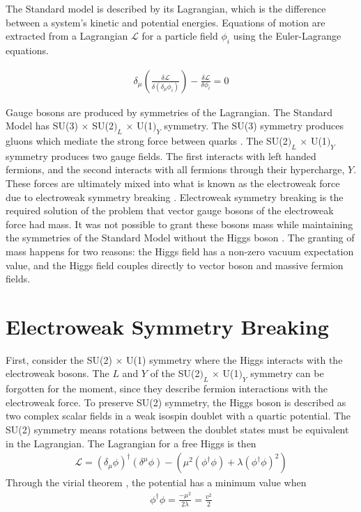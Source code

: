 The Standard model is described by its Lagrangian,
which is the difference between a system's kinetic and potential energies.
Equations of motion are extracted from a Lagrangian $\mathcal{L}$
for a particle field $\phi_i$ using the Euler-Lagrange equations.

\begin{gather}
  \delta_\mu\left(\frac{\delta \mathcal{L}}{\delta(\delta_\mu \phi_i)}\right) -
  \frac{\delta \mathcal{L}}{\delta \phi_i} = 0
\end{gather}

Gauge bosons are produced by symmetries of the Lagrangian.
The Standard Model has SU(3) $\times$ SU(2$)_L$ $\times$ U(1$)_Y$ symmetry.
The SU(3) symmetry produces gluons which mediate the strong force between quarks \cite{PhysRevLett.30.1343}.
The SU(2$)_L$ $\times$ U(1$)_Y$ symmetry produces two gauge fields.
The first interacts with left handed fermions,
and the second interacts with all fermions through their hypercharge, $Y$.
These forces are ultimately mixed into what is known as the electroweak force
due to electroweak symmetry breaking \cite{PhysRevLett.19.1264}.
Electroweak symmetry breaking is the required solution of the problem that
vector gauge bosons of the electroweak force had mass.
It was not possible to grant these bosons mass while maintaining the symmetries of the Standard Model
without the Higgs boson \cite{PhysRevLett.13.321, PhysRevLett.13.508, PhysRevLett.13.585}.
The granting of mass happens for two reasons:
the Higgs field has a non-zero vacuum expectation value,
and the Higgs field couples directly to vector boson and massive fermion fields.

\section{Electroweak Symmetry Breaking}

First, consider the SU(2) $\times$ U(1) symmetry where the Higgs interacts with the electroweak bosons.
The $L$ and $Y$ of the SU(2$)_L$ $\times$ U(1$)_Y$ symmetry can be forgotten for the moment,
since they describe fermion interactions with the electroweak force.
To preserve SU(2) symmetry, the Higgs boson is described as two complex scalar fields in
a weak isospin doublet with a quartic potential.
The SU(2) symmetry means rotations between the doublet states must be equivalent in the Lagrangian.
The Lagrangian for a free Higgs is then
\begin{gather}
  \mathcal{L} = (\delta_\mu \phi)^\dagger (\delta^\mu \phi) - (\mu^2(\phi^\dagger\phi) + \lambda(\phi^\dagger\phi)^2) \label{eq:free}
\end{gather}
Through the virial theorem \cite{1930ZPhy...63..855F}, the potential has a minimum value when
\begin{gather}
  \phi^\dagger\phi = \frac{-\mu^2}{2\lambda} = \frac{v^2}{2} \label{eq:vacuum}
\end{gather}

